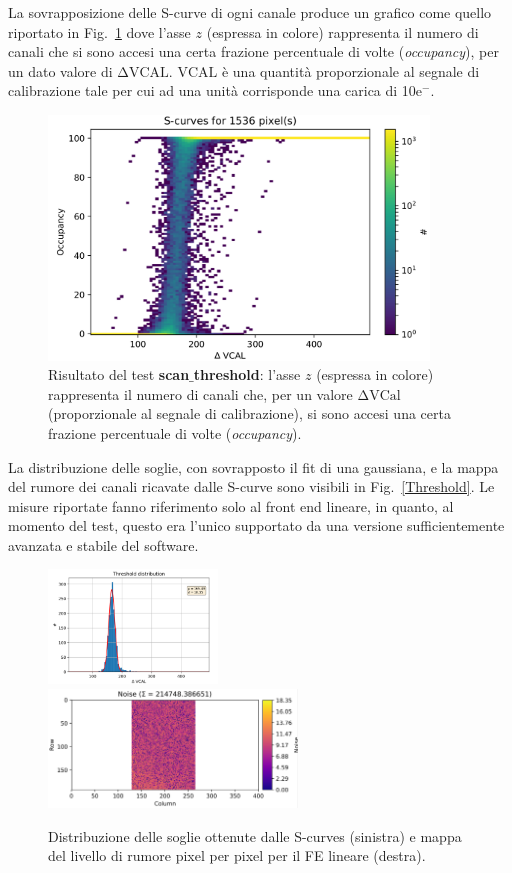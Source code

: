 \begin{description}
La sovrapposizione delle S-curve di ogni canale produce un grafico come quello riportato in Fig.~\ref{Scurves} dove l'asse $z$ (espressa in colore) rappresenta il numero di canali che si sono accesi una certa frazione percentuale di volte ({\em occupancy}), per un dato valore di $\mathrm{\Delta VCAL}$. $\mathrm{VCAL}$ \`e una quantit\`a proporzionale al segnale di calibrazione tale per cui ad una unit\`a corrisponde una carica di 10e$^-$.
\begin{figure}
\centering
\includegraphics[width=0.9\textwidth]{Immagini/Scurves}
\caption{Risultato del test \textbf{scan$\_$threshold}: l'asse $z$ (espressa in colore) rappresenta il numero di canali che, per un valore $\mathrm{\Delta VCal}$ (proporzionale al segnale di calibrazione), si sono accesi una certa frazione percentuale di volte ({\em occupancy}).}
\label{Scurves}
\end{figure}
La distribuzione delle soglie, con sovrapposto il fit di una gaussiana, e la mappa del rumore dei canali ricavate dalle S-curve sono visibili in Fig.~\ref{Threshold}. Le misure riportate fanno riferimento solo al front end lineare, in quanto, al momento del test, questo era l'unico supportato da una versione sufficientemente avanzata e stabile del software.
\begin{figure}
\centering
\includegraphics[width=0.4\textwidth]{Immagini/Threshold}
\hfill
\includegraphics[width=0.59\textwidth]{Immagini/NoiseMap}
\caption{Distribuzione delle soglie ottenute dalle S-curves (sinistra) e mappa del livello di rumore pixel per pixel per il FE lineare (destra).}
\label{Threshold}
\label{NoiseMap}
\end{figure}


\end{description}
